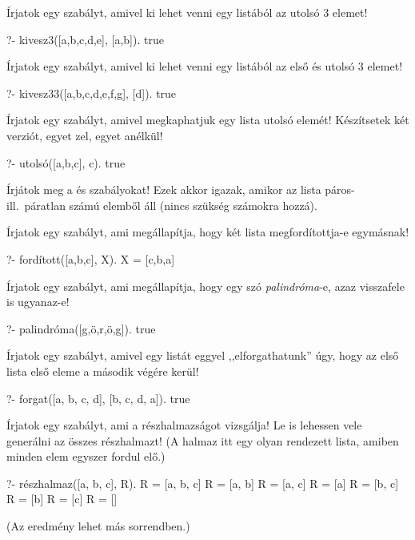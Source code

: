 \begin{problem}
Írjatok egy szabályt, amivel ki lehet venni egy
listából az utolsó 3 elemet!
\begin{query}
?- kivesz3([a,b,c,d,e], [a,b]).
true
\end{query}
\end{problem}
\begin{problem}
Írjatok egy szabályt, amivel ki lehet venni egy
listából az első és utolsó 3 elemet!
\begin{query}
?- kivesz33([a,b,c,d,e,f,g], [d]).
true
\end{query}
\end{problem}
\begin{problem}
Írjatok egy szabályt, amivel megkaphatjuk egy lista
utolsó elemét! Készítsetek két verziót, egyet
zel, egyet anélkül!
\begin{query}
?- utolsó([a,b,c], c).
true
\end{query}
\end{problem}
\begin{problem}
Írjátok meg a  és
 szabályokat! Ezek akkor
igazak, amikor az  lista páros- ill.~páratlan
számú elemből áll (nincs szükség számokra hozzá).
\end{problem}
\begin{problem}
Írjatok egy szabályt, ami megállapítja, hogy két
lista megfordítottja-e egymásnak!
\begin{query}
?- fordított([a,b,c], X).
X = [c,b,a]
\end{query}
\end{problem}
\begin{problem}
Írjatok egy szabályt, ami megállapítja, hogy egy szó
\emph{palindróma}-e, azaz visszafele is ugyanaz-e!
\begin{query}
?- palindróma([g,ö,r,ö,g]).
true
\end{query}
\end{problem}
\begin{problem}
Írjatok egy szabályt, amivel egy listát eggyel
,,elforgathatunk'' úgy, hogy az első lista első eleme
a második végére kerül!
\begin{query}
?- forgat([a, b, c, d], [b, c, d, a]).
true
\end{query}
\end{problem}
\begin{problem}
Írjatok egy szabályt, ami a részhalmazságot
vizsgálja! Le is lehessen vele generálni az összes
részhalmazt! (A halmaz itt egy olyan rendezett
lista, amiben minden elem egyszer fordul elő.)
\begin{query}
?- részhalmaz([a, b, c], R).
R = [a, b, c]
R = [a, b]
R = [a, c]
R = [a]
R = [b, c]
R = [b]
R = [c]
R = []
\end{query}
(Az eredmény lehet más sorrendben.)
\end{problem}
